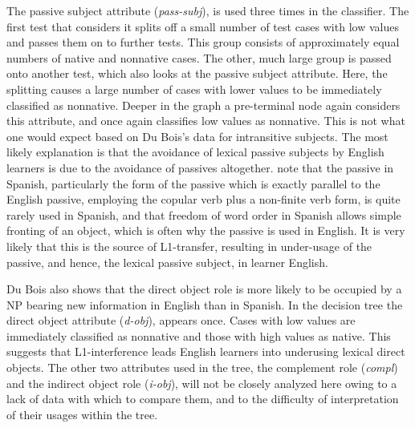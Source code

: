 \documentclass[main.tex]{subfiles}
\begin{document}
The passive subject attribute (\textit{pass-subj}), is used three times in the classifier. The first test that considers it splits off a small number of test cases with low values and passes them on to further tests. This group consists of approximately equal numbers of native and nonnative cases. The other, much large group is passed onto another test, which also looks at the passive subject attribute. Here, the splitting causes a large number of cases with lower values to be immediately classified as nonnative. Deeper in the graph a pre-terminal node again considers this attribute, and once again classifies low values as nonnative. This is not what one would expect based on Du Bois's data for intransitive subjects. The most likely explanation is that the avoidance of lexical passive subjects by English learners is due to the avoidance of passives altogether. \citet[28.2.3]{butt} note that the passive in Spanish, particularly the form of the passive which is exactly parallel to the English passive, employing the copular verb plus a non-finite verb form, is quite rarely used in Spanish, and that freedom of word order in Spanish allows simple fronting of an object, which is often why the passive is used in English. It is very likely that this is the source of L1-transfer, resulting in under-usage of the passive, and hence, the lexical passive subject, in learner English.

Du Bois also shows that the direct object role is more likely to be occupied by a NP bearing new information in English than in Spanish. In the decision tree the direct object attribute (\textit{d-obj}), appears once. Cases with low values are immediately classified as nonnative and those with high values as native. This suggests that L1-interference leads English learners into underusing lexical direct objects. The other two attributes used in the tree, the complement role (\textit{compl}) and the indirect object role (\textit{i-obj}), will not be closely analyzed here owing to a lack of data with which to compare them, and to the difficulty of interpretation of their usages within the tree.
\end{document}
